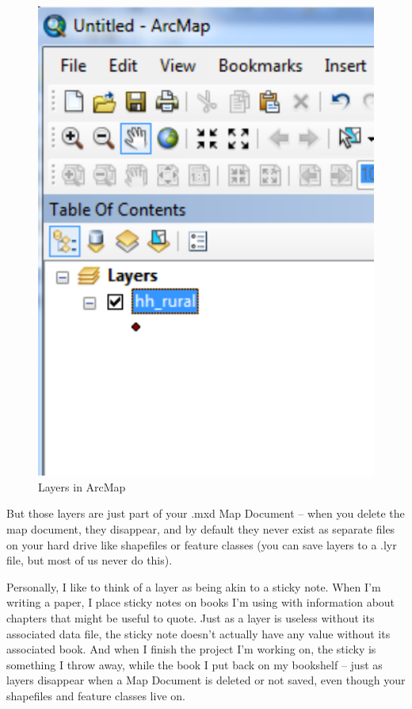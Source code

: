 \documentclass[12pt]{article}
\begin{document}
\begin{figure}[h]
	\begin{center}
		\caption{Layers in ArcMap}
\includegraphics[scale=0.8]{figures/layerExample.pdf}
	\end{center}
\end{figure}

But those layers are just part of your .mxd Map Document -- when you delete the map document, they disappear, and by default they never exist as separate files on your hard drive like shapefiles or feature classes (you can save layers to a .lyr file, but most of us never do this). 

Personally, I like to think of a layer as being akin to a sticky note. When I’m writing a paper, I place sticky notes on books I’m using with information about chapters that might be useful to quote. Just as a layer is useless without its associated data file, the sticky note doesn’t actually have any value without its associated book. And when I finish the project I’m working on, the sticky is something I throw away, while the book I put back on my bookshelf -- just as layers disappear when a Map Document is deleted or not saved, even though your shapefiles and feature classes live on.
\end{document}
